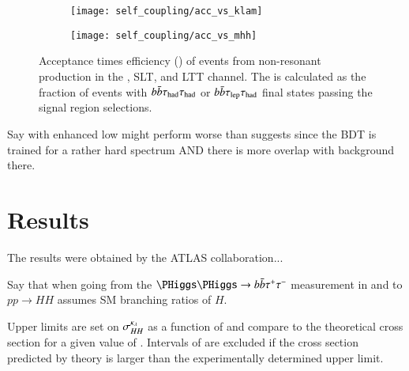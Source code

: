 \begin{figure}[htbp]
  \centering

  \begin{subfigure}[t]{0.485\textwidth}
    \texttt{[image: self\_coupling/acc\_vs\_klam]}
    \label{fig:acceptance_vs_klambda}
  \end{subfigure}\hfill%
  \begin{subfigure}[t]{0.485\textwidth}
    \texttt{[image: self\_coupling/acc\_vs\_mhh]}
    \label{fig:acceptance_vs_mhh}
  \end{subfigure}

  \caption{Acceptance times efficiency (\AccTimesEff) of events from
    non-resonant \HH production in the \hadhad, \lephad SLT, and
    \lephad LTT channel. The \AccTimesEff is calculated as the
    fraction of events with $b\bar{b}\tau_{\text{had}}\tau_{\text{had}}$ or
    $b\bar{b}\tau_{\text{lep}}\tau_{\text{had}}$ final states passing the signal region
    selections.}%
  \label{fig:acceptance_vs_klambda_vs_mhh}
\end{figure}

Say \klambda with enhanced low \mHH might perform worse than
\AccTimesEff suggests since the BDT is trained for a rather hard \mHH
spectrum AND there is more overlap with background there.


\section{Results}%
\label{sec:reinterpretation_results}


The results were obtained by the ATLAS collaboration...

Say that when going from the $\HH \to \bbbar\tautau$ measurement in
\lephad and \hadhad to $pp \to HH$ assumes SM branching ratios of $H$.

Upper limits are set on $\sigma_{HH}^{\kappa_{\lambda}}$ as a function of
\klambda and compare to the theoretical cross section for a given
value of \klambda. Intervals of \klambda are excluded if the cross
section predicted by theory is larger than the experimentally
determined upper limit.

